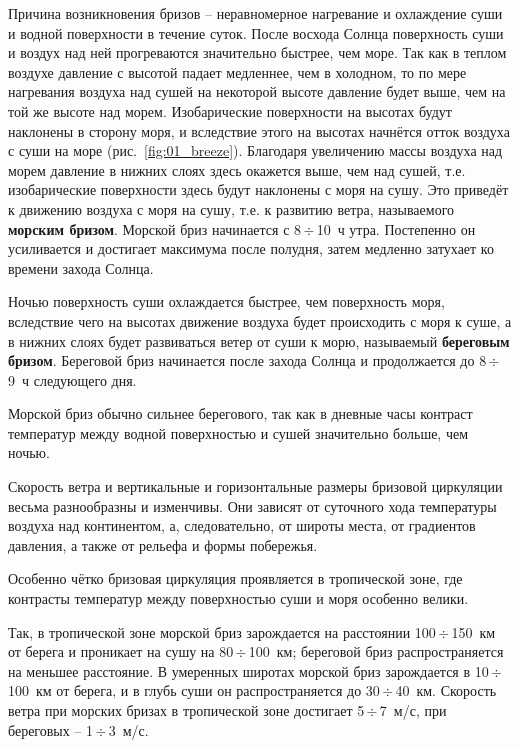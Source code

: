 \documentclass[a4paper, 12pt, twoside, final, book, russian, fittopage, cyremdash, openright]{ncc}
\newcommand{\mps}{~м/с\xspace}
\newcommand{\otdo}{\,\ensuremath{\div}\,}
\begin{document}
Причина возникновения бризов \--- неравномерное нагревание и
охлаждение суши и водной поверхности в течение суток. После восхода
Солнца поверхность суши и воздух над ней прогреваются значительно
быстрее, чем море. Так как в теплом воздухе давление с высотой падает
медленнее, чем в холодном, то по мере нагревания воздуха над сушей на
некоторой высоте давление будет выше, чем на той же высоте над
морем. Изобарические поверхности на высотах будут наклонены в сторону
моря, и вследствие этого на высотах начнётся отток воздуха с суши на
море (рис.~\ref{fig:01_breeze}). Благодаря увеличению массы воздуха
над морем давление в нижних слоях здесь окажется выше, чем над сушей,
т.е. изобарические поверхности здесь будут наклонены с моря на
сушу. Это приведёт к движению воздуха с моря на сушу, т.е. к развитию
ветра, называемого \textbf{морским
  бризом}. Морской бриз начинается с 8\otdo{}10~ч
утра. Постепенно он усиливается и достигает максимума после полудня,
затем медленно затухает ко времени захода Солнца.

Ночью поверхность суши охлаждается быстрее, чем поверхность моря,
вследствие чего на высотах движение воздуха будет происходить с моря к
суше, а в нижних слоях будет развиваться ветер от суши к морю,
называемый \textbf{береговым бризом}. Береговой
бриз начинается после захода Солнца и продолжается до 8\otdo{}9~ч
следующего дня.

Морской бриз обычно сильнее берегового, так как в дневные часы
контраст температур между водной поверхностью и сушей значительно
больше, чем ночью.

Скорость ветра и вертикальные и горизонтальные размеры бризовой
циркуляции весьма разнообразны и изменчивы. Они зависят от суточного
хода температуры воздуха над континентом, а, следовательно, от широты
места, от градиентов давления, а также от рельефа и формы побережья.

Особенно чётко бризовая циркуляция проявляется в тропической зоне, где
контрасты температур между поверхностью суши и моря особенно велики.

Так, в тропической зоне морской бриз зарождается на расстоянии
100\otdo{}150~км от берега и проникает на сушу на 80\otdo{}100~км; береговой
бриз распространяется на меньшее расстояние. В умеренных широтах
морской бриз зарождается в 10\otdo{}100~км от берега, и в глубь суши он
распространяется до 30\otdo{}40~км. Скорость ветра при морских бризах в
тропической зоне достигает 5\otdo{}7\mps{}, при береговых \--- 1\otdo{}3\mps{}.
\end{document}
